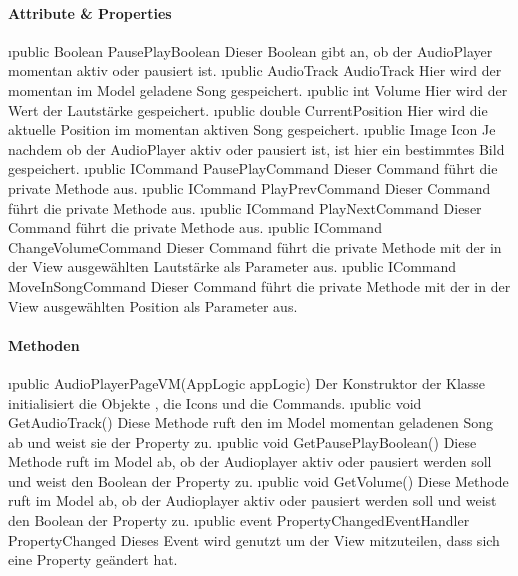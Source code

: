 \documentclass[../entwurf.tex]{subfiles}
\begin{document}
\paragraph{Attribute \& Properties}
\begin{itemize}
	\i{public Boolean PausePlayBoolean} Dieser Boolean gibt an, ob der AudioPlayer momentan aktiv oder pausiert ist.
	\i{public AudioTrack AudioTrack} Hier wird der momentan im Model geladene Song gespeichert.
	\i{public int Volume} Hier wird der Wert der Lautstärke gespeichert.
	\i{public double CurrentPosition} Hier wird die aktuelle Position im momentan aktiven Song gespeichert.
	\i{public Image Icon} Je nachdem ob der AudioPlayer aktiv oder pausiert ist, ist hier ein bestimmtes Bild gespeichert.
	\i{public ICommand PausePlayCommand} Dieser Command führt die private Methode  aus.
	\i{public ICommand PlayPrevCommand} Dieser Command führt die private Methode  aus.
	\i{public ICommand PlayNextCommand} Dieser Command führt die private Methode  aus.
	\i{public ICommand ChangeVolumeCommand} Dieser Command führt die private Methode  mit der in der View ausgewählten Lautstärke als Parameter aus.
	\i{public ICommand MoveInSongCommand} Dieser Command führt die private Methode  mit der in der View ausgewählten Position als Parameter aus.
\end{itemize}
\paragraph{Methoden}
\begin{itemize}
	\i{public AudioPlayerPageVM(AppLogic appLogic)} Der Konstruktor der Klasse initialisiert die Objekte , die Icons und die Commands.
	\i{public void GetAudioTrack()} Diese Methode ruft den im Model momentan geladenen Song ab und weist sie der Property  zu.
	\i{public void GetPausePlayBoolean()} Diese Methode ruft im Model ab, ob der Audioplayer aktiv oder pausiert werden soll und weist den Boolean der Property  zu.
	\i{public void GetVolume()} Diese Methode ruft im Model ab, ob der Audioplayer aktiv oder pausiert werden soll und weist den Boolean der Property  zu.
	\i{public event PropertyChangedEventHandler PropertyChanged} Dieses Event wird genutzt um der View mitzuteilen, dass sich eine Property geändert hat.
\end{itemize}
\end{document}
